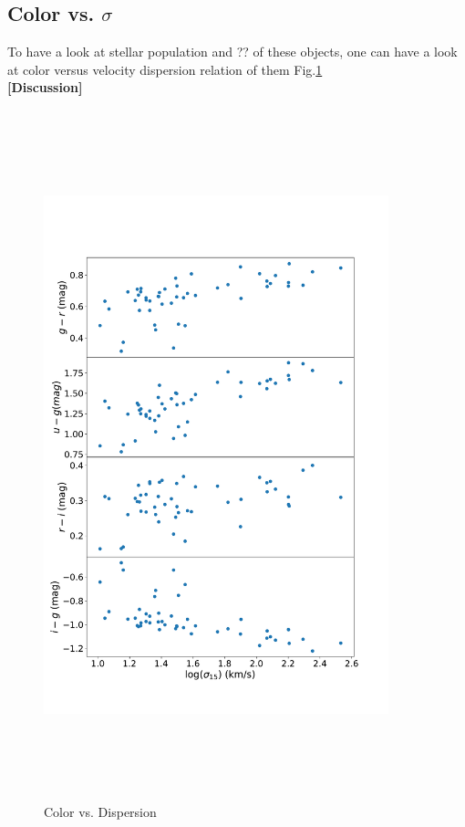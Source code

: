 \documentclass{aa}
\begin{document}
\subsection{Color vs. $\sigma$}
To have a look at stellar population and ?? of these objects, one can have a look at color versus velocity dispersion relation of them Fig.\ref{fig:CI-S}\\
\textbf{[Discussion]} 
\begin{figure}[!htb]
   \centering
   \includegraphics[width=10cm,height=20cm,keepaspectratio]{../2_pipeline/1_color_Disp/Color_Disp.pdf}
         \caption{Color vs. Dispersion}
         \label{fig:CI-S}
\end{figure}
\end{document}

